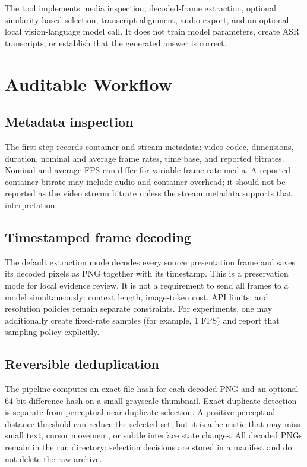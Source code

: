 \documentclass[11pt]{article}
\begin{document}
The tool implements media inspection, decoded-frame extraction, optional similarity-based selection, transcript alignment, audio export, and an optional local vision-language model call. It does not train model parameters, create ASR transcripts, or establish that the generated answer is correct.

\section{Auditable Workflow}
\subsection{Metadata inspection}
The first step records container and stream metadata: video codec, dimensions, duration, nominal and average frame rates, time base, and reported bitrates. Nominal and average FPS can differ for variable-frame-rate media. A reported container bitrate may include audio and container overhead; it should not be reported as the video stream bitrate unless the stream metadata supports that interpretation.

\subsection{Timestamped frame decoding}
The default extraction mode decodes every source presentation frame and saves its decoded pixels as PNG together with its timestamp. This is a preservation mode for local evidence review. It is not a requirement to send all frames to a model simultaneously: context length, image-token cost, API limits, and resolution policies remain separate constraints. For experiments, one may additionally create fixed-rate samples (for example, 1 FPS) and report that sampling policy explicitly.

\subsection{Reversible deduplication}
The pipeline computes an exact file hash for each decoded PNG and an optional 64-bit difference hash on a small grayscale thumbnail. Exact duplicate detection is separate from perceptual near-duplicate selection. A positive perceptual-distance threshold can reduce the selected set, but it is a heuristic that may miss small text, cursor movement, or subtle interface state changes. All decoded PNGs remain in the run directory; selection decisions are stored in a manifest and do not delete the raw archive.
\end{document}
